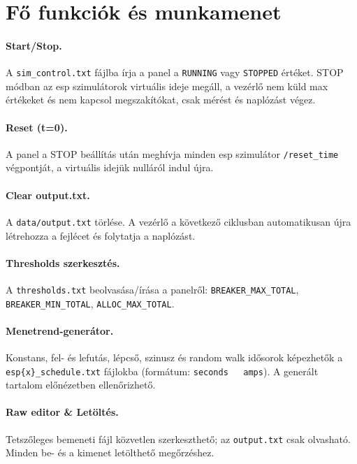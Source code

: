 \section{Fő funkciók és munkamenet}
\paragraph{Start/Stop.} A \texttt{sim\_control.txt} fájlba írja a panel 
a \texttt{RUNNING} vagy \texttt{STOPPED} értéket. STOP módban az esp szimulátorok virtuális ideje megáll, 
a vezérlő nem küld max értékeket és nem kapcsol megszakítókat, csak mérést és naplózást végez.
\paragraph{Reset (t=0).} A panel a STOP beállítás után meghívja minden esp szimulátor \texttt{/reset\_time} 
végpontját, a virtuális idejük nulláról indul újra.
\paragraph{Clear output.txt.} A \texttt{data/output.txt} törlése. A vezérlő a következő ciklusban 
automatikusan újra létrehozza a fejlécet és folytatja a naplózást.
\paragraph{Thresholds szerkesztés.} A \texttt{thresholds.txt} beolvasása/írása a panelről: 
\texttt{BREAKER\_MAX\_TOTAL}, \texttt{BREAKER\_MIN\_TOTAL}, \texttt{ALLOC\_MAX\_TOTAL}.
\paragraph{Menetrend-generátor.} Konstans, fel- és lefutás, lépcső, szinusz és random walk idősorok képezhetők 
a \texttt{esp\{x\}\_schedule.txt} fájlokba (formátum: \texttt{seconds\ \ \ amps}). 
A generált tartalom előnézetben ellenőrizhető.
\paragraph{Raw editor \& Letöltés.} Tetszőleges bemeneti fájl közvetlen szerkeszthető; 
az \texttt{output.txt} csak olvasható. Minden be- és a kimenet letölthető megőrzéshez.

